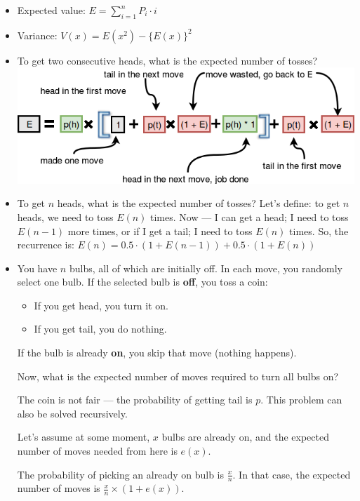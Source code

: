 \vspace{-5.5mm}
{\small
\begin{itemize}
\item Expected value: $E = \sum_{i=1}^{n} P_i \cdot i$
\item Variance: $V(x) = E(x^2) - \{E(x)\}^2$
\item To get two consecutive heads, what is the expected number of tosses?
\includegraphics[width=\linewidth]{images/expected_value_1.png}
\item To get $n$ heads, what is the expected number of tosses? Let’s define: to get $n$ heads, we need to toss $E(n)$ times. Now — I can get a head; I need to toss $E(n-1)$ more times, or if I get a tail; I need to toss $E(n)$ times. So, the recurrence is: $E(n) = 0.5 \cdot (1 + E(n-1)) + 0.5 \cdot (1 + E(n))$
\item {
    You have $n$ bulbs, all of which are initially off. In each move, you randomly select one bulb. If the selected bulb is \textbf{off}, you toss a coin:
    \begin{itemize}
        \item If you get head, you turn it on.
        \item If you get tail, you do nothing.
    \end{itemize}

    If the bulb is already \textbf{on}, you skip that move (nothing happens).

    \par %
    Now, what is the expected number of moves required to turn all bulbs on?

    The coin is not fair — the probability of getting tail is $p$.
    This problem can also be solved recursively.

    \par
    Let's assume at some moment, $x$ bulbs are already on, and the expected number of moves needed from here is $e(x)$.

    The probability of picking an already on bulb is $\frac{x}{n}$.
    In that case, the expected number of moves is $\frac{x}{n} \times (1 + e(x))$.

}
\end{itemize}}

